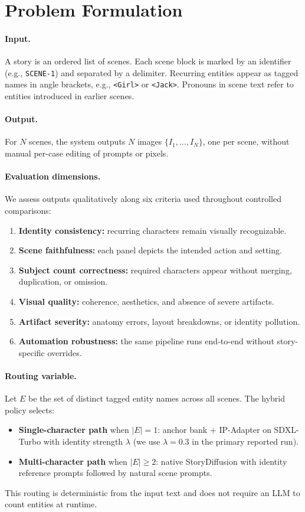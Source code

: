 \section{Problem Formulation}
\label{sec:problem}

\paragraph{Input.}
A story is an ordered list of scenes.
Each scene block is marked by an identifier (e.g., \texttt{SCENE-1}) and separated by a delimiter.
Recurring entities appear as tagged names in angle brackets, e.g., \texttt{<Girl>} or \texttt{<Jack>}.
Pronouns in scene text refer to entities introduced in earlier scenes.

\paragraph{Output.}
For $N$ scenes, the system outputs $N$ images $\{I_1,\ldots,I_N\}$, one per scene, without manual per-case editing of prompts or pixels.

\paragraph{Evaluation dimensions.}
We assess outputs qualitatively along six criteria used throughout controlled comparisons:
\begin{enumerate}
  \item \textbf{Identity consistency:} recurring characters remain visually recognizable.
  \item \textbf{Scene faithfulness:} each panel depicts the intended action and setting.
  \item \textbf{Subject count correctness:} required characters appear without merging, duplication, or omission.
  \item \textbf{Visual quality:} coherence, aesthetics, and absence of severe artifacts.
  \item \textbf{Artifact severity:} anatomy errors, layout breakdowns, or identity pollution.
  \item \textbf{Automation robustness:} the same pipeline runs end-to-end without story-specific overrides.
\end{enumerate}

\paragraph{Routing variable.}
Let $E$ be the set of distinct tagged entity names across all scenes.
The hybrid policy selects:
\begin{itemize}
  \item \textbf{Single-character path} when $|E|=1$: anchor bank + IP-Adapter on SDXL-Turbo with identity strength $\lambda$ (we use $\lambda=0.3$ in the primary reported run).
  \item \textbf{Multi-character path} when $|E|\geq 2$: native StoryDiffusion with identity reference prompts followed by natural scene prompts.
\end{itemize}

This routing is deterministic from the input text and does not require an LLM to count entities at runtime.

